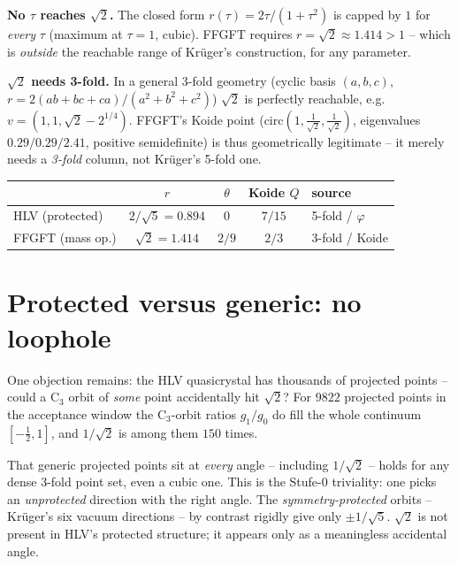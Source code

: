 \textbf{No $\tau$ reaches $\sqrt2$.} The closed form $r(\tau)=2\tau/(1+\tau^2)$ is
capped by $1$ for \emph{every} $\tau$ (maximum at $\tau=1$, cubic). FFGFT requires
$r=\sqrt2\approx1.414>1$ -- which is \emph{outside} the reachable range of
Kr\"uger's construction, for any parameter.

\textbf{$\sqrt2$ needs 3-fold.} In a general 3-fold geometry (cyclic basis
$(a,b,c)$, $r=2(ab+bc+ca)/(a^2+b^2+c^2)$) $\sqrt2$ is perfectly reachable, e.g.
$v=(1,1,\sqrt2-2^{1/4})$. FFGFT's Koide point
($\mathrm{circ}(1,\tfrac1{\sqrt2},\tfrac1{\sqrt2})$, eigenvalues $0.29/0.29/2.41$,
positive semidefinite) is thus geometrically legitimate -- it merely needs a
\emph{3-fold} column, not Kr\"uger's 5-fold one.

\begin{center}
\begin{tabular}{lcccl}
\toprule
 & $r$ & $\theta$ & Koide $Q$ & source \\
\midrule
HLV (protected) & $2/\sqrt5=0.894$ & $0$ & $7/15$ & 5-fold / $\varphi$ \\
FFGFT (mass op.) & $\sqrt2=1.414$ & $2/9$ & $2/3$ & 3-fold / Koide \\
\bottomrule
\end{tabular}
\end{center}

\section{Protected versus generic: no loophole}

One objection remains: the HLV quasicrystal has thousands of projected points --
could a C$_3$ orbit of \emph{some} point accidentally hit $\sqrt2$? For $9822$
projected points in the acceptance window the C$_3$-orbit ratios $g_1/g_0$ do fill
the whole continuum $[-\tfrac12,1]$, and $1/\sqrt2$ is among them $150$ times.

\begin{warningboxenv}
That generic projected points sit at \emph{every} angle -- including $1/\sqrt2$ --
holds for any dense 3-fold point set, even a cubic one. This is the Stufe-0
triviality: one picks an \emph{unprotected} direction with the right angle. The
\emph{symmetry-protected} orbits -- Kr\"uger's six vacuum directions -- by contrast
rigidly give only $\pm1/\sqrt5$. $\sqrt2$ is not present in HLV's protected
structure; it appears only as a meaningless accidental angle.
\end{warningboxenv}

